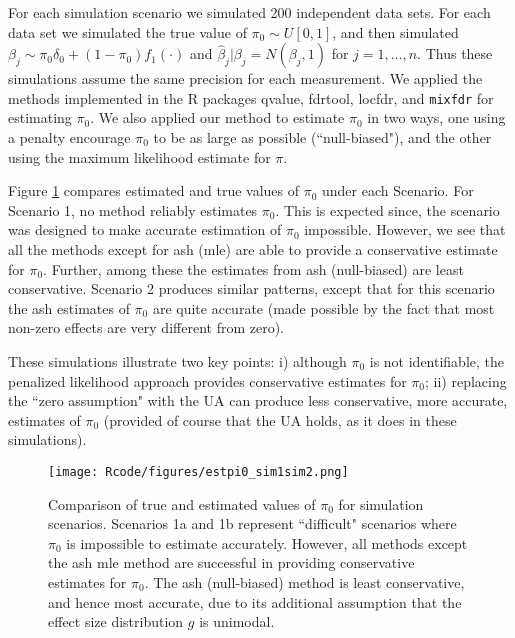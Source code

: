 \documentclass[11pt]{article}
\def\bhat{\hat{\beta}}
\def\mixfdr{{\tt mixfdr}\xspace}
\begin{document}
For each simulation scenario we simulated 200 independent data sets. For each data set we simulated
the true value of $\pi_0  \sim U[0,1]$, and then simulated $\beta_j \sim \pi_0 \delta_0 + (1-\pi_0) f_1(\cdot)$
and $\bhat_j | \beta_j = N(\beta_j,1)$ for $j=1,\dots,n$. Thus these simulations assume the same
precision for each measurement. We applied the methods implemented in the R packages qvalue, fdrtool, locfdr, and \mixfdr
for estimating $\pi_0$. We also applied our method to estimate $\pi_0$ in two ways, one using a penalty encourage
$\pi_0$ to be as large as possible (``null-biased"), and the other using the maximum likelihood estimate for $\pi$.


Figure \ref{fig:pi0} compares estimated and true values of $\pi_0$ under each Scenario. 
For Scenario 1, no method reliably estimates $\pi_0$. This is expected since, the scenario was designed to make accurate estimation
of $\pi_0$ impossible. However, we see that all the methods except for ash (mle) are able to provide a conservative
estimate for $\pi_0$. Further, among these the estimates from ash (null-biased) are least conservative. Scenario 2 produces similar patterns,
except that for this scenario the ash estimates of $\pi_0$ are quite accurate (made possible by the fact that most non-zero effects
are very different from zero).

These simulations illustrate two key points: i) although $\pi_0$ is not identifiable, the penalized likelihood approach
provides conservative estimates for $\pi_0$; ii) replacing the ``zero assumption" with the UA can produce
less conservative, more accurate, estimates of $\pi_0$ (provided of course that the UA holds, as it does in these simulations).

\begin{figure}[!ht] \label{fig:pi0}
\begin{center}
\texttt{[image: Rcode/figures/estpi0\_sim1sim2.png]}
\end{center}
\caption{Comparison of true and estimated values of $\pi_0$ for simulation scenarios. Scenarios 1a and 1b represent ``difficult" scenarios where $\pi_0$ is impossible to estimate accurately. However, all methods except the ash mle method are successful in providing conservative estimates for $\pi_0$. The ash (null-biased) method is least conservative, and hence most accurate, due to its additional assumption that the effect size distribution $g$ is unimodal.}
\end{figure}
\end{document}
